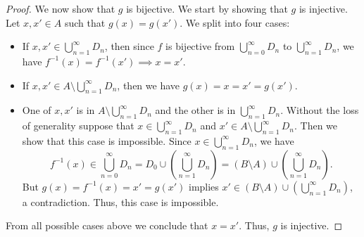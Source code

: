 \begin{proof}
  We now show that \(g\) is bijective.
  We start by showing that \(g\) is injective.
  Let \(x, x' \in A\) such that \(g(x) = g(x')\).
  We split into four cases:
  \begin{itemize}
    \item If \(x, x' \in \bigcup_{n = 1}^\infty D_n\), then since \(f\) is bijective from \(\bigcup_{n = 0}^\infty D_n\) to \(\bigcup_{n = 1}^\infty D_n\), we have \(f^{-1}(x) = f^{-1}(x') \implies x = x'\).
    \item If \(x, x' \in A \setminus \bigcup_{n = 1}^\infty D_n\), then we have \(g(x) = x = x' = g(x')\).
    \item One of \(x, x'\) is in \(A \setminus \bigcup_{n = 1}^\infty D_n\) and the other is in \(\bigcup_{n = 1}^\infty D_n\).
          Without the loss of generality suppose that \(x \in \bigcup_{n = 1}^\infty D_n\) and \(x' \in A \setminus \bigcup_{n = 1}^\infty D_n\).
          Then we show that this case is impossible.
          Since \(x \in \bigcup_{n = 1}^\infty D_n\), we have
          \[
            f^{-1}(x) \in \bigcup_{n = 0}^\infty D_n = D_0 \cup (\bigcup_{n = 1}^\infty D_n) = (B \setminus A) \cup (\bigcup_{n = 1}^\infty D_n).
          \]
          But \(g(x) = f^{-1}(x) = x' = g(x')\) implies \(x' \in (B \setminus A) \cup (\bigcup_{n = 1}^\infty D_n)\), a contradiction.
          Thus, this case is impossible.
  \end{itemize}
  From all possible cases above we conclude that \(x = x'\).
  Thus, \(g\) is injective.


\end{proof}
